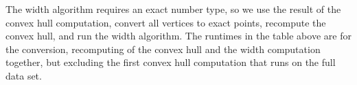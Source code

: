 The width algorithm requires an exact number type, so we use the
result of the convex hull computation, convert all vertices to exact
points, recompute the convex hull, and run the width algorithm. The
runtimes in the table above are for the conversion, recomputing of the
convex hull and the width computation together, but excluding the
first convex hull computation that runs on the full data set.



